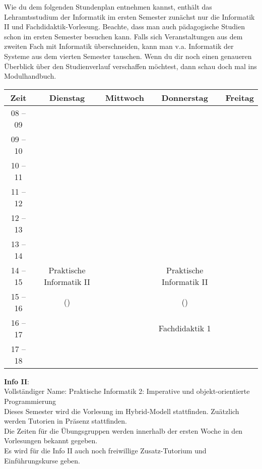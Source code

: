Wie du dem folgenden Stundenplan entnehmen kannst, enthält das Lehramtsstudium der Informatik im ersten Semester zunächst nur die Informatik II und Fachdidaktik-Vorlesung.
Beachte, dass man auch pädagogische Studien schon im ersten Semester besuchen kann. Falls sich Veranstaltungen aus dem zweiten
Fach mit Informatik überschneiden, kann man v.a. Informatik der Systeme aus dem vierten Semester tauschen.
Wenn du dir noch einen genaueren Überblick über den Studienverlauf verschaffen möchtest, dann schau doch mal ins Modulhandbuch.

\begin{center}
	\begin{tabular}{|c|c|c|c|c|}
		\hline
		Zeit     & Dienstag                   & Mittwoch & Donnerstag                 & Freitag \\ \hline
		08 -- 09 &                            &          &                            &         \\ \hline
		09 -- 10 &                            &          &                            &         \\ \hline
		10 -- 11 &                            &          &                            &         \\ \hline
		11 -- 12 &                            &          &                            &         \\ \hline
		12 -- 13 &                            &          &                            &         \\ \hline
		13 -- 14 &                            &          &                            &         \\ \hline
		14 -- 15 & Praktische Informatik II   &          & Praktische Informatik II   &         \\ \cline{1-1}
		15 -- 16 & (\Infoprof)                &          & (\Infoprof) &         \\ \hline
		16 -- 17 &                            &          & Fachdidaktik 1             &         \\ \hline
		17 -- 18 &                            &          &                            &         \\ \hline
		\end{tabular}

\end{center}

\textbf{Info II}:\\
Vollständiger Name: Praktische Informatik 2: Imperative und objekt-orientierte Programmierung\\
Dieses Semester wird die Vorlesung im Hybrid-Modell stattfinden. Zuätzlich werden Tutorien in Präsenz stattfinden.\\

Die Zeiten für die Übungsgruppen werden innerhalb der ersten Woche in den Vorlesungen bekannt gegeben.\\
Es wird für die Info II auch noch freiwillige Zusatz-Tutorium und Einführungskurse geben. 
